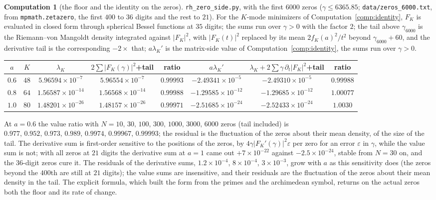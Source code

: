 \documentclass[11pt]{article}
\theoremstyle{definition}
\newtheorem{computation}[theorem]{Computation}
\theoremstyle{remark}
\begin{document}
\begin{computation}[the floor and the identity on the zeros]\label{comp:zeros}
\texttt{rh\_zero\_side.py}, with the first $6000$ zeros ($\gamma\le6365.85$; \texttt{data/zeros\_6000.txt}, from \texttt{mpmath.zetazero}, the first $400$ to $36$ digits and the rest to $21$). For the $K$-mode minimizers of Computation~\ref{comp:identity}, $F_K$ is evaluated in closed form through spherical Bessel functions at $35$ digits; the sums run over $\gamma>0$ with the factor $2$; the tail above $\gamma_{6000}$ is the Riemann--von Mangoldt density integrated against $|F_K|^2$, with $|F_K(t)|^2$ replaced by its mean $2f_K(a)^2/t^2$ beyond $\gamma_{6000}+60$, and the derivative tail is the corresponding $-2\times$ that; $a\lambda_K'$ is the matrix-side value of Computation~\ref{comp:identity}, the sums run over $\gamma>0$.
\begin{center}\footnotesize
\begin{tabular}{@{}cccccccc@{}}
\toprule
$a$ & $K$ & $\lambda_K$ & $2\sum|F_K(\gamma)|^2$+tail & ratio & $a\lambda_K'$ & $\lambda_K+2\sum\gamma\,\partial_t|F_K|^2$+tail & ratio\\
\midrule
$0.6$ & $48$ & $5.96594\times10^{-7}$ & $5.96554\times10^{-7}$ & $0.99993$ & $-2.49341\times10^{-5}$ & $-2.49310\times10^{-5}$ & $0.99988$\\
$0.8$ & $64$ & $1.56587\times10^{-14}$ & $1.56568\times10^{-14}$ & $0.99988$ & $-1.29585\times10^{-12}$ & $-1.29685\times10^{-12}$ & $1.00077$\\
$1.0$ & $80$ & $1.48201\times10^{-26}$ & $1.48157\times10^{-26}$ & $0.99971$ & $-2.51685\times10^{-24}$ & $-2.52433\times10^{-24}$ & $1.0030$\\
\bottomrule
\end{tabular}
\end{center}
At $a=0.6$ the value ratio with $N=10,\,30,\,100,\,300,\,1000,\,3000,\,6000$ zeros (tail included) is $0.977,\,0.952,\,0.973,\,0.989,\,0.9974,\,0.99967,\,0.99993$; the residual is the fluctuation of the zeros about their mean density, of the size of the tail. The derivative sum is first-order sensitive to the positions of the zeros, by $4\gamma|F_K'(\gamma)|^2\varepsilon$ per zero for an error $\varepsilon$ in $\gamma$, while the value sum is not; with all zeros at $21$ digits the derivative sum at $a=1$ came out $+7\times10^{-22}$ against $-2.5\times10^{-24}$, stable from $N=30$ on, and the $36$-digit zeros cure it. The residuals of the derivative sums, $1.2\times10^{-4}$, $8\times10^{-4}$, $3\times10^{-3}$, grow with $a$ as this sensitivity does (the zeros beyond the $400$th are still at $21$ digits); the value sums are insensitive, and their residuals are the fluctuation of the zeros about their mean density in the tail. The explicit formula, which built the form from the primes and the archimedean symbol, returns on the actual zeros both the floor and its rate of change.
\end{computation}
\end{document}
